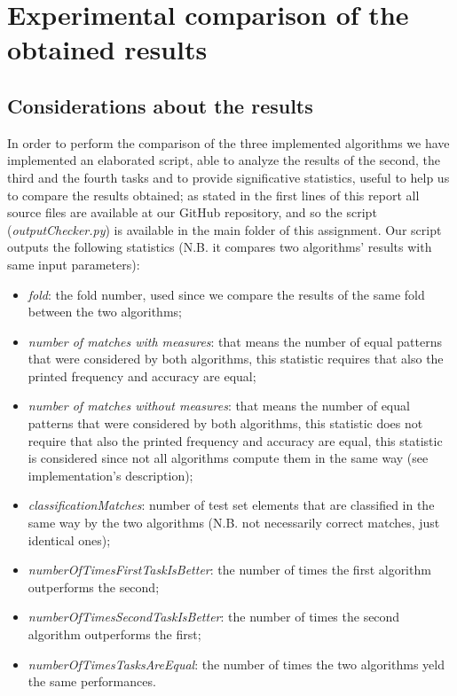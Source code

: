 \documentclass[11pt, a4paper]{article}
\begin{document}
	\section{Experimental comparison of the obtained results}
		\subsection{Considerations about the results}
		In order to perform the comparison of the three implemented algorithms we have implemented an elaborated script, able to analyze the results of the second, the third and the fourth tasks and to provide significative statistics, useful to help us to compare the results obtained; as stated in the first lines of this report all source files are available at our GitHub repository, and so the script (\textit{outputChecker.py}) is available in the main folder of this assignment. \newline
		Our script outputs the following statistics (N.B. it compares two algorithms' results with same input parameters):
		\begin{itemize}
			\item \textit{fold}: the fold number, used since we compare the results of the same fold between the two algorithms;
			\item \textit{number of matches with measures}: that means the number of equal patterns that were considered by both algorithms, this statistic requires that also the printed frequency and accuracy are equal;
			\item \textit{number of matches without measures}: that means the number of equal patterns that were considered by both algorithms, this statistic does not require that also the printed frequency and accuracy are equal, this statistic is considered since not all algorithms compute them in the same way (see implementation's description);
			\item \textit{classificationMatches}: number of test set elements that are classified in the same way by the two algorithms (N.B. not necessarily correct matches, just identical ones);
			\item \textit{numberOfTimesFirstTaskIsBetter}: the number of times the first algorithm outperforms the second;
			\item \textit{numberOfTimesSecondTaskIsBetter}: the number of times the second algorithm outperforms the first;
			\item \textit{numberOfTimesTasksAreEqual}: the number of times the two algorithms yeld the same performances.
		\end{itemize}
\end{document}

